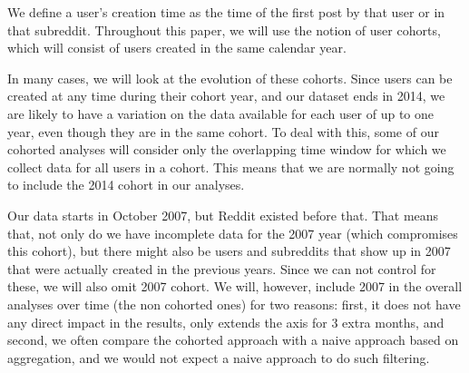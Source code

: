 We define a user's creation time as the time of the first post by that user or in that subreddit.  Throughout this paper, we will use the notion of user cohorts, which will consist of users created in the same calendar year.

In many cases, we will look at the evolution of these cohorts. Since users can be created at any time during their cohort year, and our dataset ends in 2014, 
we are likely to have a variation on the data available for each user of up to one year, even though they are in the same cohort.  To deal with this, some of our cohorted analyses will consider only the overlapping time window for which we collect data for all users in a cohort.   This means that we are normally not going to include the 2014 cohort in our analyses.

Our data starts in October 2007, but Reddit existed before that. That means that, not only do we have incomplete data for the 2007 year (which compromises this cohort), but there might also be users and subreddits that show up in 2007 that were actually created in the previous years. Since we can not control for these, we will also omit 2007 cohort. We will, however, include 2007 in the overall analyses over time (the non cohorted ones) for two reasons: first, it does not have any direct impact in the results, only extends the axis for 3 extra months, and second, we often compare the cohorted approach with a naive approach based on aggregation, and we would not expect a naive approach to do such filtering. 